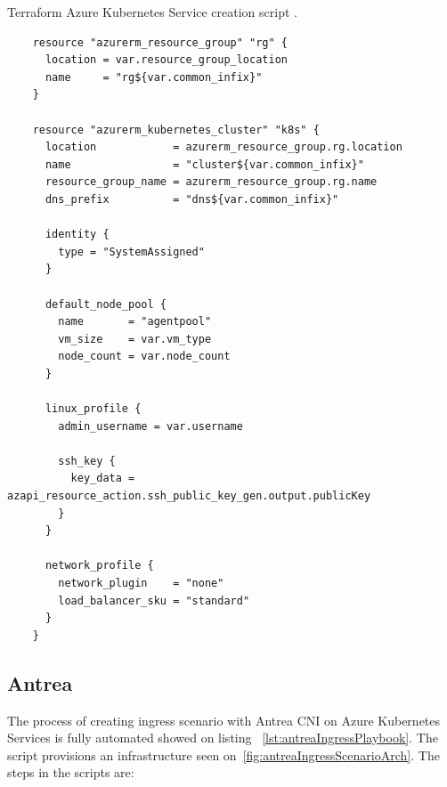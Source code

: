 \begin{listing}[htb]
  \centering
  \caption{Terraform Azure Kubernetes Service creation script \cite{AKS}.}
  \begin{verbatim}
    resource "azurerm_resource_group" "rg" {
      location = var.resource_group_location
      name     = "rg${var.common_infix}"
    }

    resource "azurerm_kubernetes_cluster" "k8s" {
      location            = azurerm_resource_group.rg.location
      name                = "cluster${var.common_infix}"
      resource_group_name = azurerm_resource_group.rg.name
      dns_prefix          = "dns${var.common_infix}"

      identity {
        type = "SystemAssigned"
      }

      default_node_pool {
        name       = "agentpool"
        vm_size    = var.vm_type
        node_count = var.node_count
      }

      linux_profile {
        admin_username = var.username

        ssh_key {
          key_data = azapi_resource_action.ssh_public_key_gen.output.publicKey
        }
      }

      network_profile {
        network_plugin    = "none"
        load_balancer_sku = "standard"
      }
    }
  \end{verbatim}
  \label{lst:terraformScript}
\end{listing}


\subsection{Antrea}
\label{sec:antreaIngressImpl}

The process of creating ingress scenario with Antrea CNI on Azure Kubernetes Services is fully automated showed on listing ~\ref{lst:antreaIngressPlaybook}. The script provisions an infrastructure seen on~\ref{fig:antreaIngressScenarioArch}. The steps in the scripts are: 


